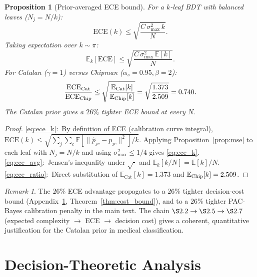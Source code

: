\documentclass[ba,preprint]{imsart}
\theoremstyle{plain}
\newtheorem{proposition}[theorem]{Proposition}
\theoremstyle{remark}
\newtheorem{remark}[theorem]{Remark}
\newcommand{\Eop}{\mathbb{E}}
\newcommand{\Cat}{\mathrm{Cat}}
\begin{document}
\begin{proposition}[Prior-averaged ECE bound]
\label{prop:ece}
  For a $k$-leaf BDT with balanced leaves ($N_j = N/k$):
  \begin{equation}
    \mathrm{ECE}(k) \leq \sqrt{\frac{C\,\sigma^2_{\max}\,k}{N}}.
    \label{eq:ece_k}
  \end{equation}
  Taking expectation over $k \sim \pi$:
  \begin{equation}
    \Eop_k[\mathrm{ECE}] \leq \sqrt{\frac{C\,\sigma^2_{\max}\,\Eop[k]}{N}}.
    \label{eq:ece_avg}
  \end{equation}
  For Catalan ($\gamma=1$) versus Chipman ($\alpha_s=0.95,\beta=2$):
  \begin{equation}
    \frac{\mathrm{ECE}_{\Cat}}{\mathrm{ECE}_{\rm Chip}}
    \leq \sqrt{\frac{\Eop_{\Cat}[k]}{\Eop_{\rm Chip}[k]}}
    = \sqrt{\frac{1.373}{2.509}} = 0.740.
    \label{eq:ece_ratio}
  \end{equation}
  The Catalan prior gives a $26\%$ tighter ECE bound at every $N$.
\end{proposition}

\begin{proof}
  \eqref{eq:ece_k}:~By definition of ECE (calibration curve integral),
  $\mathrm{ECE}(k) \leq \sqrt{\sum_j\sum_c\Eop[\|\hat{p}_{jc}-p_{jc}\|^2]/k}$.
  Applying Proposition~\ref{prop:mse} to each leaf with $N_j=N/k$ and
  using $\sigma^2_{\max} \leq 1/4$ gives \eqref{eq:ece_k}.
  \eqref{eq:ece_avg}:~Jensen's inequality under $\sqrt{\cdot}$ and
  $\Eop_k[k/N] = \Eop[k]/N$.
  \eqref{eq:ece_ratio}:~Direct substitution of $\Eop_{\Cat}[k]=1.373$ and
  $\Eop_{\rm Chip}[k]=2.509$.
\end{proof}

\begin{remark}
The $26\%$ ECE advantage propagates to a $26\%$ tighter
decision-cost bound (Appendix~\ref{sec:decision}, Theorem~\ref{thm:cost_bound}),
and to a $26\%$ tighter PAC-Bayes calibration penalty in the main text.
The chain $\S2.2 \to \S2.5 \to \S2.7$ (expected complexity $\to$
ECE $\to$ decision cost) gives a coherent, quantitative justification
for the Catalan prior in medical classification.
\end{remark}

\section{Decision-Theoretic Analysis}
\label{sec:decision}
\end{document}
